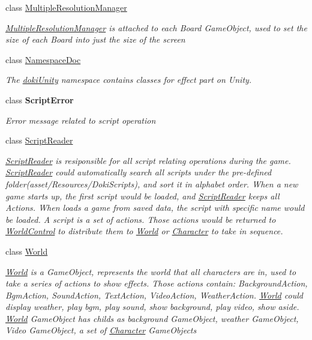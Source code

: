 \begin{DoxyCompactItemize}
class \hyperlink{classdoki_unity_1_1_multiple_resolution_manager}{Multiple\+Resolution\+Manager}
\begin{DoxyCompactList}\small\item\em \hyperlink{classdoki_unity_1_1_multiple_resolution_manager}{Multiple\+Resolution\+Manager} is attached to each Board Game\+Object, used to set the size of each Board into just the size of the screen \end{DoxyCompactList}\item 
class \hyperlink{classdoki_unity_1_1_namespace_doc}{Namespace\+Doc}
\begin{DoxyCompactList}\small\item\em The \hyperlink{namespacedoki_unity}{doki\+Unity} namespace contains classes for effect part on Unity. \end{DoxyCompactList}\item 
class {\bfseries Script\+Error}
\begin{DoxyCompactList}\small\item\em Error message related to script operation \end{DoxyCompactList}\item 
class \hyperlink{classdoki_unity_1_1_script_reader}{Script\+Reader}
\begin{DoxyCompactList}\small\item\em \hyperlink{classdoki_unity_1_1_script_reader}{Script\+Reader} is resiponsible for all script relating operations during the game. \hyperlink{classdoki_unity_1_1_script_reader}{Script\+Reader} could automatically search all scripts under the pre-\/defined folder(asset/\+Resources/\+Doki\+Scripts), and sort it in alphabet order. When a new game starts up, the first script would be loaded, and \hyperlink{classdoki_unity_1_1_script_reader}{Script\+Reader} keeps all Actions. When loads a game from saved data, the script with specific name would be loaded. A script is a set of actions. Those actions would be returned to \hyperlink{classdoki_unity_1_1_world_control}{World\+Control} to distribute them to \hyperlink{classdoki_unity_1_1_world}{World} or \hyperlink{classdoki_unity_1_1_character}{Character} to take in sequence. \end{DoxyCompactList}\item 
class \hyperlink{classdoki_unity_1_1_world}{World}
\begin{DoxyCompactList}\small\item\em \hyperlink{classdoki_unity_1_1_world}{World} is a Game\+Object, represents the world that all characters are in, used to take a series of actions to show effects. Those actions contain\+: Background\+Action, Bgm\+Action, Sound\+Action, Text\+Action, Video\+Action, Weather\+Action. \hyperlink{classdoki_unity_1_1_world}{World} could display weather, play bgm, play sound, show background, play video, show aside. \hyperlink{classdoki_unity_1_1_world}{World} Game\+Object has childs as background Game\+Object, weather Game\+Object, Video Game\+Object, a set of \hyperlink{classdoki_unity_1_1_character}{Character} Game\+Objects \end{DoxyCompactList}\item 

\end{DoxyCompactItemize}
